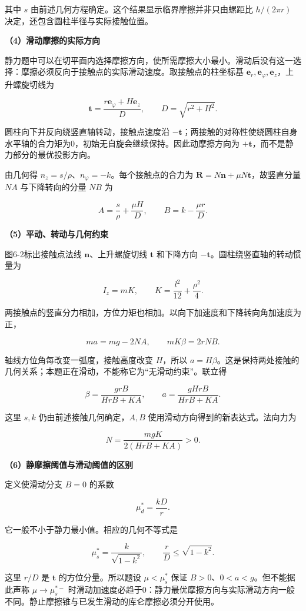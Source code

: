 \documentclass[12pt,a4paper,UTF8]{ctexart}
\begin{document}
其中 \(s\) 由前述几何方程确定。这个结果显示临界摩擦并非只由螺距比
\(h/(2\pi r)\) 决定，还包含圆柱半径与实际接触位置。

\textbf{（4）滑动摩擦的实际方向}

静力题中可以在切平面内选择摩擦方向，使所需摩擦大小最小。滑动后没有这一选择：摩擦必须反向于接触点的实际滑动速度。取接触点的柱坐标基
\(\bm e_r,\bm e_\varphi,\bm e_z\)，上升螺旋切线为

\[\bm t=\frac{r\bm e_\varphi+H\bm e_z}{D},\qquad D=\sqrt{r^2+H^2}.\]

圆柱向下并反向绕竖直轴转动，接触点速度沿
\(-\bm t\)；两接触的对称性使绕圆柱自身水平轴的合力矩为0，初始无自旋会继续保持。因此动摩擦方向为
\(+\bm t\)，而不是静力部分的最优投影方向。

由几何得 \(n_z=s/\rho\)、\(n_\varphi=-k\)。每个接触点的合力为
\(\bm R=N\bm n+\mu N\bm t\)，故竖直分量 \(NA\) 与下降转向的分量 \(NB\)
为

\[\boxed{A=\frac{s}{\rho}+\frac{\mu H}{D},\qquad
B=k-\frac{\mu r}{D}.}\]

\textbf{（5）平动、转动与几何约束}

图6-2标出接触点法线 \(\bm n\)、上升螺旋切线 \(\bm t\) 和下降方向
\(-\bm t\)。圆柱绕竖直轴的转动惯量为

\[I_z=mK,\qquad K=\frac{l^2}{12}+\frac{\rho^2}{4}.\]

两接触点的竖直分力相加，方位力矩也相加。以向下加速度和下降转向角加速度为正，

\[ma=mg-2NA,\qquad mK\beta=2rNB.\]

轴线方位角每改变一弧度，接触高度改变 \(H\)，所以
\(a=H\beta\)。这是保持两处接触的几何关系；本题正在滑动，不能称它为``无滑动约束''。联立得

\[\boxed{\beta=\frac{grB}{HrB+KA},\qquad
 a=\frac{gHrB}{HrB+KA}.}\]

这里 \(s,k\) 仍由前述接触几何确定，\(A,B\)
使用滑动方向得到的新表达式。法向力为

\[N=\frac{mgK}{2(HrB+KA)}>0.\]

\textbf{（6）静摩擦阈值与滑动阈值的区别}

定义使滑动分支 \(B=0\) 的系数

\[\mu_d^*=\frac{kD}{r}.\]

它一般不小于静力最小值。相应的几何不等式是

\[\mu_s^*=\frac{k}{\sqrt{1-k^2}},\qquad
\frac rD\le\sqrt{1-k^2}.\]

这里 \(r/D\) 是 \(\bm t\) 的方位分量。所以题设 \(\mu<\mu_s^*\) 保证
\(B>0\)、\(0<a<g\)。但不能据此声称 \(\mu\to\mu_s^{*-}\)
时滑动加速度必趋于0：静力最优摩擦方向与实际滑动方向一般不同。静止摩擦锥与已发生滑动的库仑摩擦必须分开使用。
\end{document}
